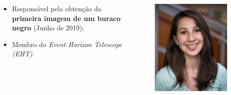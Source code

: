 \documentclass[11pt, brazil]{beamer}
\begin{document}
\begin{frame}
\begin{columns}
\begin{enumerate}
\begin{itemize}
   \item Responsável pela obtenção da {\bf primeira imagem de um buraco negro} (Junho de 2019);
   \item Membro do {\em Event Horizon Telescope (EHT)}.  
  \end{itemize}
\end{enumerate}
\begin{figure}
 \includegraphics[scale=0.3]{figuras/katie.jpg}
\end{figure}
\end{columns}
\end{frame}

\end{document}
